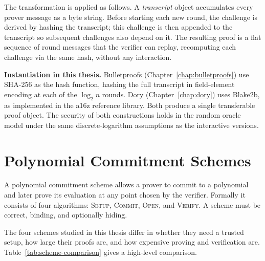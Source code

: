 The transformation is applied as follows. A \emph{transcript} object
accumulates every prover message as a byte string. Before starting each
new round, the challenge is derived by hashing the transcript; this
challenge is then appended to the transcript so subsequent challenges also
depend on it. The resulting proof is a flat sequence of round messages
that the verifier can replay, recomputing each challenge via the same
hash, without any interaction.

\textbf{Instantiation in this thesis.}
Bulletproofs (Chapter~\ref{chap:bulletproofs}) use SHA-256 as the hash
function, hashing the full transcript in field-element encoding at each of
the $\log_2 n$ rounds. Dory (Chapter~\ref{chap:dory}) uses Blake2b, as
implemented in the a16z reference library. Both produce a single
transferable proof object. The security of both constructions holds in the
random oracle model under the same discrete-logarithm assumptions as the
interactive versions.

\section{Polynomial Commitment Schemes}
\label{sec:pcs-overview}
 
A polynomial commitment scheme allows a prover to commit to a
polynomial and later prove its evaluation at any point chosen by
the verifier. Formally it consists of four algorithms:
\textsc{Setup}, \textsc{Commit}, \textsc{Open}, and \textsc{Verify}.
A scheme must be correct, binding, and optionally hiding.
 
The four schemes studied in this thesis differ in whether they need
a trusted setup, how large their proofs are, and how expensive
proving and verification are. Table~\ref{tab:scheme-comparison}
gives a high-level comparison.
 
\begin{table}[h!]
\centering
\caption{High-level comparison of the four polynomial commitment
schemes. $d$ is the polynomial degree and $\mu$ is the number of
variables for multilinear polynomials.}
\label{tab:scheme-comparison}
\end{table}
 
